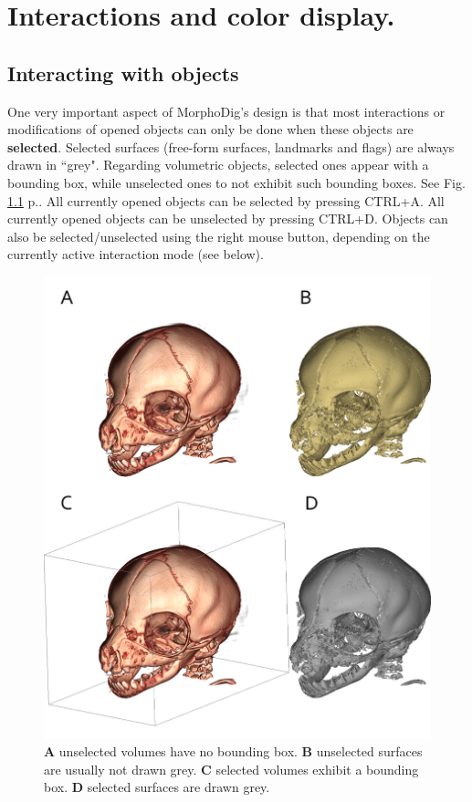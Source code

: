 \chapter{Interactions and color display. }
\minitoc  


\section{Interacting with objects}
One very important aspect of MorphoDig's design is that most interactions or modifications of opened objects can only be done when these objects are \textbf{selected}. 
Selected surfaces (free-form surfaces, landmarks and flags) are always drawn in ``grey". Regarding volumetric objects, selected ones appear with a bounding box, while unselected ones to not exhibit such bounding boxes. See Fig. \ref{selected_unselected} p.\pageref{selected_unselected}.
All currently opened objects can be selected by pressing CTRL+A. All currently opened objects can be unselected by pressing CTRL+D. Objects can also be selected/unselected using the right mouse button, depending on the currently active interaction mode (see below).


\begin{figure}
  \centering
  \includegraphics[scale=0.39]{images/04/selected_unselected2.png} 
	\caption{\textbf{A} unselected volumes have no bounding box. \textbf{B} unselected surfaces are usually not drawn grey. \textbf{C} selected volumes exhibit a bounding box. \textbf{D} selected surfaces are drawn grey.}
\label{selected_unselected}
 
\end{figure}

